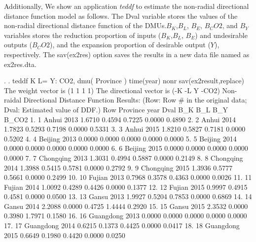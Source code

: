 Additionally, We show an application \textit{teddf} to estimate the non-radial directional distance function model as follows. The Dval variable stores the values of the non-radial directional distance function of the DMUs.$B_K$,$B_L$, $B_E$, $B_CO2$, and $B_Y$ variables stores the reduction proportion of inputs ($B_K$,$B_L$, $B_E$) and undesirable outputs ($B_CO2$), and the expansion proportion of desirable output ($Y$), respectively. The sav(ex2res) option saves the results in a new data file named as ex2res.dta.

. 
. teddf K L= Y: CO2, dmu( Province ) time(year) nonr sav(ex2result,replace)
{\smallskip}
The weight vector is (1 1 1 1)
{\smallskip}
The directional vector is (-K -L Y -CO2)
{\smallskip}
{\smallskip}
Non-raidal Directional Distance Function Results:
(Row: Row \# in the original data; Dval: Estimated value of DDF.)
{\smallskip}
{\TLC}
{\VBAR} Row         Province   year     Dval      B_K      B_L      B_Y    B_CO2 {\VBAR}
{\LFTT}
1. {\VBAR}   1            Anhui   2013   1.6710   0.4594   0.7225   0.0000   0.4890 {\VBAR}
2. {\VBAR}   2            Anhui   2014   1.7823   0.5293   0.7198   0.0000   0.5331 {\VBAR}
3. {\VBAR}   3            Anhui   2015   1.8210   0.5827   0.7181   0.0000   0.5202 {\VBAR}
4. {\VBAR}   4          Beijing   2013   0.0000   0.0000   0.0000   0.0000   0.0000 {\VBAR}
5. {\VBAR}   5          Beijing   2014   0.0000   0.0000   0.0000   0.0000   0.0000 {\VBAR}
6. {\VBAR}   6          Beijing   2015   0.0000   0.0000   0.0000   0.0000   0.0000 {\VBAR}
7. {\VBAR}   7        Chongqing   2013   1.3031   0.4994   0.5887   0.0000   0.2149 {\VBAR}
8. {\VBAR}   8        Chongqing   2014   1.3988   0.5415   0.5781   0.0000   0.2792 {\VBAR}
9. {\VBAR}   9        Chongqing   2015   1.3936   0.5777   0.5661   0.0000   0.2499 {\VBAR}
10. {\VBAR}  10           Fujian   2013   0.7968   0.3578   0.4363   0.0000   0.0026 {\VBAR}
11. {\VBAR}  11           Fujian   2014   1.0092   0.4289   0.4426   0.0000   0.1377 {\VBAR}
12. {\VBAR}  12           Fujian   2015   0.9997   0.4915   0.4581   0.0000   0.0500 {\VBAR}
13. {\VBAR}  13            Gansu   2013   1.9927   0.5204   0.7853   0.0000   0.6869 {\VBAR}
14. {\VBAR}  14            Gansu   2014   2.2088   0.0000   0.4725   1.4444   0.2920 {\VBAR}
15. {\VBAR}  15            Gansu   2015   2.3532   0.0000   0.3980   1.7971   0.1580 {\VBAR}
16. {\VBAR}  16        Guangdong   2013   0.0000   0.0000   0.0000   0.0000   0.0000 {\VBAR}
17. {\VBAR}  17        Guangdong   2014   0.6215   0.1373   0.4425   0.0000   0.0417 {\VBAR}
18. {\VBAR}  18        Guangdong   2015   0.6649   0.1980   0.4420   0.0000   0.0250 {\VBAR}
